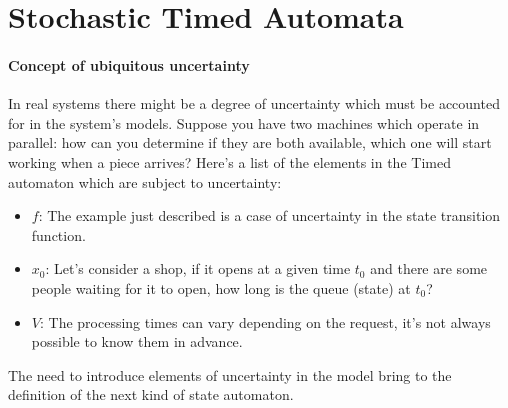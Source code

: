 \documentclass[12pt,a4paper]{article}
\begin{document}
\section{Stochastic Timed Automata}
\paragraph{Concept of ubiquitous uncertainty}
In real systems there might be a degree of uncertainty which must be accounted for in the system's models. Suppose you have two machines which operate in parallel: how can you determine if they are both available, which one will start working when a piece arrives? Here’s a list of the elements in the Timed automaton which are subject to uncertainty:
\begin{itemize}
\item $f$: The example just described is a case of uncertainty in the state transition function.
\item $x_0$: Let’s consider a shop, if it opens at a given time $t_0$ and there are some people waiting for it to open, how long is the queue (state) at $t_0$? 
\item $V$: The processing times can vary depending on the request, it’s not always possible to know them in advance.
\end{itemize}
The need to introduce elements of uncertainty in the model bring to the definition of the next kind of state automaton.
\end{document}
